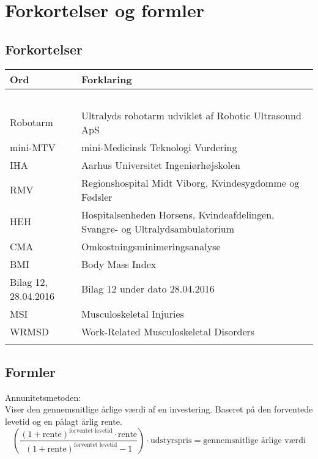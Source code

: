 \chapter{Forkortelser og formler}

\section{Forkortelser}
\begin{longtabu} to 
    Ord &    Forklaring\\
    \toprule\ \\
    Robotarm & Ultralyds robotarm udviklet af Robotic Ultrasound ApS \\
    mini-MTV & mini-Medicinsk Teknologi Vurdering \\
    IHA & Aarhus Universitet Ingeniørhøjskolen \\
  	RMV & Regionshospital Midt Viborg, Kvindesygdomme og Fødsler \\
  	HEH & Hospitalsenheden Horsens, Kvindeafdelingen, Svangre- og Ultralydsambulatorium \\
  	CMA & Omkostningsminimeringsanalyse \\
  	BMI & Body Mass Index \\
  	Bilag 12, 28.04.2016 & Bilag 12 under dato 28.04.2016 \\
  	MSI & Musculoskeletal Injuries \\
  	WRMSD & Work-Related Musculoskeletal Disorders \\
   
\label{forkort}
\end{longtabu}

\section{Formler} \label{Formler}
Annunitetsmetoden: \\
Viser den gennemsnitlige årlige værdi af en investering. Baseret på den forventede levetid og en pålagt årlig rente.
\begin{equation}
\left( \dfrac{(1+\text{rente})^{\text{forventet levetid}}\cdot \text{rente}}{(1+\text{rente})^{\text{forventet levetid}}-1}\right)\cdot \text{udstyrspris} = \text{gennemsnitlige årlige værdi}
\end{equation}